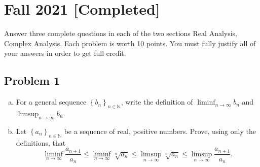 \documentclass[12pt]{article}
\newcommand{\n}{\mathbb{N}}
\newcommand\setb[1]{\left \{ #1 \right \}}
\theoremstyle{definition}
\begin{document}
\newpage
\section{Fall 2021 [Completed]}
Answer three complete questions in each of the two sections Real Analysis, Complex Analysis. Each problem is worth 10 points. You must fully justify all of your answers in order to get full credit. 

\subsection{Problem 1 \texorpdfstring{\cite{Rudin,Evan}}{}}
\begin{enumerate}[(a)]
    \item For a general sequence $\setb{ b_n }_{n \in \n}$, write the definition of $\liminf_{n \to \infty} b_n$ and $\limsup_{n \to \infty} b_n$. 
    \item Let $\setb{ a_n }_{n \in \n}$ be a sequence of real, positive numbers. Prove, using only the definitions, that 
    \[
        \liminf\limits_{n \to \infty} \frac{a_{n+1}}{a_n} \leq \liminf\limits_{n \to \infty} \sqrt[n]{a_n} \leq \limsup\limits_{n \to \infty} \sqrt[n]{a_n} \leq \limsup\limits_{n \to \infty} \frac{ a_{n+1} }{a_n} . 
    \]
\end{enumerate}
\end{document}
